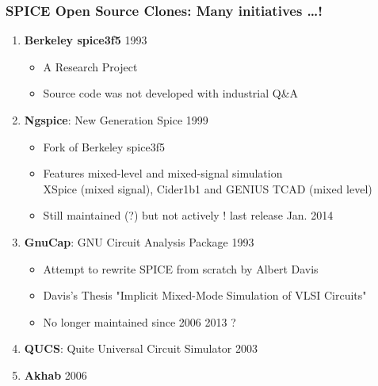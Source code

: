 
\begin{frame}
  \frametitle{SPICE Open Source Clones: Many initiatives \ldots !}
  \begin{enumerate}
  \item \textbf{Berkeley spice3f5} \alert{1993} %
    \begin{itemize}
    \item A Research Project
    \item Source code \alert{was not developed with industrial Q\&A}
    \end{itemize}
  \item \textbf{Ngspice}: New Generation Spice \alert{1999}
    \begin{itemize}
    \item \alert{Fork of Berkeley spice3f5}
    \item Features mixed-level and mixed-signal simulation \\
      XSpice (mixed signal), Cider1b1 and GENIUS TCAD (mixed level)
    \item \alert{Still maintained (?) but not actively !} {\tiny last release Jan. 2014}
    \end{itemize}
  \item \textbf{GnuCap}: GNU Circuit Analysis Package \alert{1993}
    \begin{itemize}
    \item Attempt to rewrite SPICE from scratch by Albert Davis
    \item Davis's Thesis "Implicit Mixed-Mode Simulation of VLSI Circuits"
    \item No longer maintained since 2006 {\tiny 2013 ?}
    \end{itemize}
  \item \textbf{QUCS}: Quite Universal Circuit Simulator \alert{2003}
  \item \textbf{Akhab} \alert{2006}
  \end{enumerate}
\end{frame}

